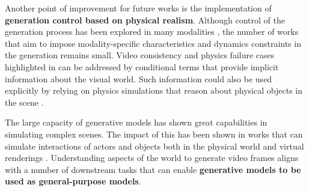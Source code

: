 Another point of improvement for future works is the implementation of \textbf{generation control based on physical realism}. Although control of the generation process has been explored in many modalities , the number of works that aim to impose modality-specific characteristics and dynamics constraints in the generation remains small. Video consistency and physics failure cases highlighted in  can be addressed by conditional terms that provide implicit information about the visual world. Such information could also be used explicitly by relying on physics simulations that reason about physical objects in the scene .

The large capacity of generative models has shown great capabilities in simulating complex scenes. The impact of this has been shown in works that can simulate interactions of actors and objects both in the physical world  and virtual renderings . Understanding aspects of the world to generate video frames aligns with a number of downstream tasks that can enable \textbf{generative models to be used as general-purpose models}. 